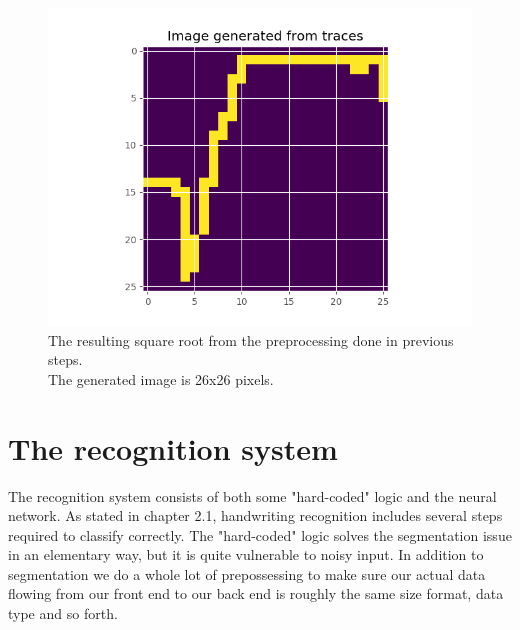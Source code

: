 \begin{figure}[H]
    \centering
    \includegraphics[width=\linewidth,keepaspectratio]{Assets/Chapter3_Method/sqrt_image.png}
    \caption{The resulting square root from the preprocessing done in previous steps.\\The generated image is 26x26 pixels.}
    \label{fig:sqrt_img}
\end{figure}




\section{The recognition system}
The recognition system consists of both some "hard-coded" logic and the neural network. As stated in chapter 2.1, handwriting recognition includes several steps required to classify correctly. The "hard-coded" logic solves the segmentation issue in an elementary way, but it is quite vulnerable to noisy input. In addition to segmentation we do a whole lot of prepossessing to make sure our actual data flowing from our front end to our back end is roughly the same size format, data type and so forth. %


